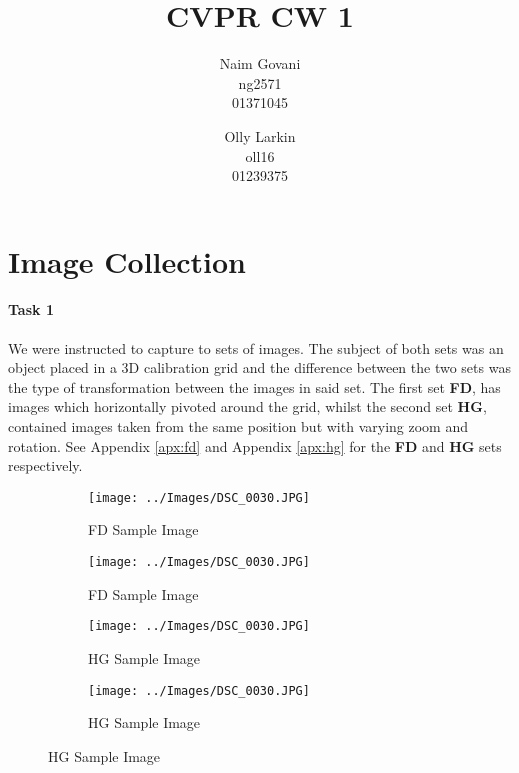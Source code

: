 \documentclass[10pt,twocolumn,letterpaper]{article}
\begin{document}
\title{CVPR CW 1}

\author{Naim Govani\\
ng2571\\
01371045\\
\and
Olly Larkin\\
oll16\\
01239375\\
}

\maketitle

\section{Image Collection}

\paragraph{Task 1} We were instructed to capture to sets of images. The subject of both sets was an object placed in a 3D calibration grid and the difference between the two sets was the type of transformation between the images in said set. The first set \textbf{FD}, has images which horizontally pivoted around the grid, whilst the second set \textbf{HG}, contained images taken from the same position but with varying zoom and rotation. See Appendix \ref{apx:fd} and Appendix \ref{apx:hg} for the \textbf{FD} and \textbf{HG} sets respectively.

\begin{figure}[ht]
\begin{center}
   \begin{subfigure}{0.49\linewidth}
   \centering
   \texttt{[image: ../Images/DSC\_0030.JPG]}
   \caption{FD Sample Image}
   \label{fd:subfig:1}
   \end{subfigure}
   \begin{subfigure}{0.49\linewidth}
   \centering
   \texttt{[image: ../Images/DSC\_0030.JPG]}
   \caption{FD Sample Image}
   \label{fd:subfig:2}
   \end{subfigure}
\newline
   \begin{subfigure}{0.49\linewidth}
   \centering
   \texttt{[image: ../Images/DSC\_0030.JPG]}
   \caption{HG Sample Image}
   \label{hg:subfig:1}
   \end{subfigure}
   \begin{subfigure}{0.49\linewidth}
   \centering
   \texttt{[image: ../Images/DSC\_0030.JPG]}
   \caption{HG Sample Image}
   \label{hg:subfig:2}
   \end{subfigure}
\end{center}
\label{fig:1}
\end{figure}
\end{document}

